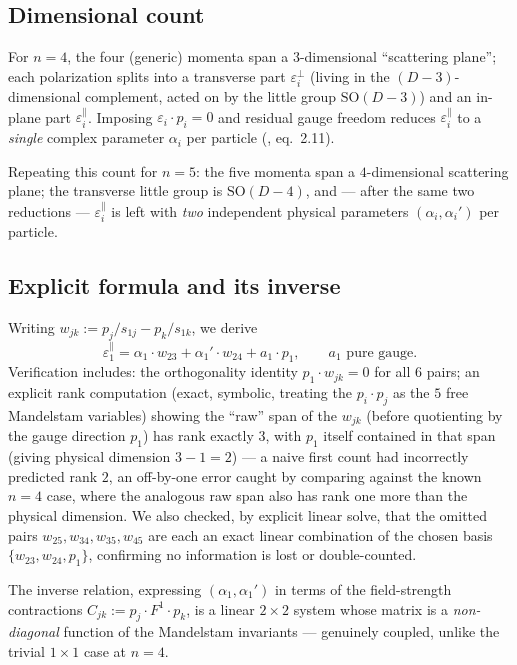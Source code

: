 \documentclass[reqno]{amsart}
\newcommand{\SO}{\mathrm{SO}}
\begin{document}
\subsection{Dimensional count}

For $n=4$, the four (generic) momenta span a $3$-dimensional ``scattering plane''; each
polarization splits into a transverse part $\varepsilon_i^\perp$ (living in the
$(D-3)$-dimensional complement, acted on by the little group $\SO(D-3)$) and an in-plane part
$\varepsilon_i^\parallel$. Imposing $\varepsilon_i\cdot p_i=0$ and residual gauge freedom reduces
$\varepsilon_i^\parallel$ to a \emph{single} complex parameter $\alpha_i$ per particle
(\cite{cgghjm2019}, eq.~2.11).

Repeating this count for $n=5$: the five momenta span a $4$-dimensional scattering plane; the
transverse little group is $\SO(D-4)$, and --- after the same two reductions ---
$\varepsilon_i^\parallel$ is left with \emph{two} independent physical parameters
$(\alpha_i,\alpha_i')$ per particle.

\subsection{Explicit formula and its inverse}

Writing $w_{jk}:=p_j/s_{1j}-p_k/s_{1k}$, we derive
\[
\varepsilon_1^\parallel=\alpha_1\cdot w_{23}+\alpha_1'\cdot w_{24}+a_1\cdot p_1,
\qquad a_1 \text{ pure gauge.}
\]
Verification includes: the orthogonality identity $p_1\cdot w_{jk}=0$ for all $6$ pairs; an
explicit rank computation (exact, symbolic, treating the $p_i\cdot p_j$ as the $5$ free Mandelstam
variables) showing the ``raw'' span of the $w_{jk}$ (before quotienting by the gauge direction
$p_1$) has rank exactly $3$, with $p_1$ itself contained in that span (giving physical dimension
$3-1=2$) --- a naive first count had incorrectly predicted rank $2$, an off-by-one error caught by
comparing against the known $n=4$ case, where the analogous raw span also has rank one more than
the physical dimension. We also checked, by explicit linear solve, that the omitted pairs
$w_{25},w_{34},w_{35},w_{45}$ are each an exact linear combination of the chosen basis
$\{w_{23},w_{24},p_1\}$, confirming no information is lost or double-counted.

The inverse relation, expressing $(\alpha_1,\alpha_1')$ in terms of the field-strength contractions
$C_{jk}:=p_j\cdot F^1\cdot p_k$, is a linear $2\times2$ system whose matrix is a
\emph{non-diagonal} function of the Mandelstam invariants --- genuinely coupled, unlike the
trivial $1\times1$ case at $n=4$.
\end{document}
